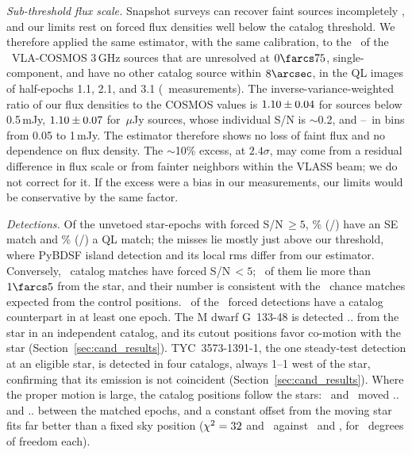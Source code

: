 \documentclass[linenumbers]{aastex702}
\makeatletter
\newcommand{\asec}[1]{\expandafter\asec@i#1..\@nil}
\def\asec@i#1.#2.#3\@nil{\ifx\relax#2\relax#1\arcsec\else#1\farcs#2\fi}
\makeatother
\begin{document}
\emph{Sub-threshold flux scale.} Snapshot surveys can recover faint sources incompletely \citep{White2007}, and our limits rest on forced flux densities well below the catalog threshold. We therefore applied the same estimator, with the same calibration, to the \CosN\ of the \CosNcat\ VLA-COSMOS 3\,GHz sources \citep{Smolcic2017} that are unresolved at $0\farcs75$, single-component, and have no other catalog source within $8\arcsec$, in the QL images of half-epochs 1.1, 2.1, and 3.1 (\CosNmeas\ measurements). The inverse-variance-weighted ratio of our flux densities to the COSMOS values is $1.10\pm0.04$ for sources below 0.5\,mJy, $1.10\pm0.07$ for \CosLoBin\,$\mu$Jy sources, whose individual S/N is $\sim$0.2, and \CosRatioMin--\CosRatioMax\ in bins from 0.05 to 1\,mJy. The estimator therefore shows no loss of faint flux and no dependence on flux density. The $\sim$10\% excess, at $2.4\sigma$, may come from a residual difference in flux scale or from fainter neighbors within the VLASS beam; we do not correct for it. If the excess were a bias in our measurements, our limits would be conservative by the same factor.

\emph{Detections.} Of the unvetoed star-epochs with forced S/N\,$\ge5$, \XcConcSEpct\% (\XcConcSE/\XcConcSEN) have an SE match and \XcConcQLpct\% (\XcConcQL/\XcConcQLN) a QL match; the misses lie mostly just above our threshold, where PyBDSF island detection and its local rms differ from our estimator. Conversely, \XcCatLtFive\ catalog matches have forced S/N\,$<5$; \XcCatLtFiveOff\ of them lie more than $1\farcs5$ from the star, and their number is consistent with the \XcCatChance\ chance matches expected from the control positions. \XcCandCat\ of the \NCandStars\ forced detections have a catalog counterpart in at least one epoch. The M dwarf G~133-48 is detected \asec{\GOTEsep} from the star in an independent catalog, and its cutout positions favor co-motion with the star (Section~\ref{sec:cand_results}). TYC~3573-1391-1, the one steady-test detection at an eligible star, is detected in four catalogs, always 1--1 west of the star, confirming that its emission is not coincident (Section~\ref{sec:cand_results}). Where the proper motion is large, the catalog positions follow the stars: \XcMoveAName\ and \XcMoveBName\ moved \asec{\XcMoveASpan} and \asec{\XcMoveBSpan} between the matched epochs, and a constant offset from the moving star fits far better than a fixed sky position ($\chi^2=32$ and \XcMoveBCo\ against \XcMoveASt\ and \XcMoveBSt, for \XcMoveADof\ degrees of freedom each).
\end{document}
